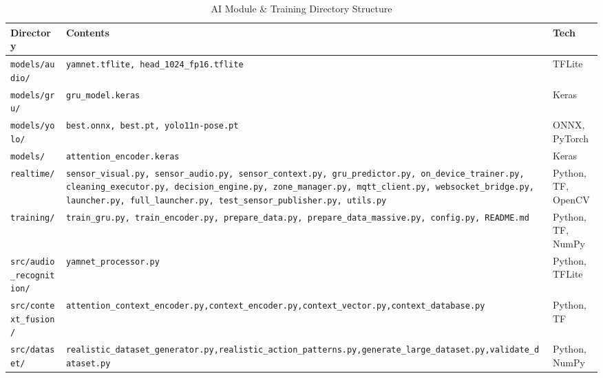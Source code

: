 \documentclass[conference]{IEEEtran}
\begin{document}
\begin{table}[H]
\caption{AI Module \& Training Directory Structure}
\def\arraystretch{1.2}
\footnotesize
\begin{tabular}{|>{\raggedright\arraybackslash}p{2.6cm}|>{\raggedright\arraybackslash}p{3.5cm}|p{1.4cm}|}
\hline
\textbf{Directory} & \textbf{Contents} & \textbf{Tech} \\
\hline
\texttt{models/audio/} & \texttt{yamnet.tflite, head\_1024\_fp16.tflite} & TFLite \\
\hline
\texttt{models/gru/} & \texttt{gru\_model.keras} & Keras \\
\hline
\texttt{models/yolo/} & \texttt{best.onnx, best.pt, yolo11n-pose.pt} & ONNX, PyTorch \\
\hline
\texttt{models/} & \texttt{attention\_encoder.keras} & Keras \\
\hline
\texttt{realtime/} & \texttt{sensor\_visual.py, sensor\_audio.py, sensor\_context.py, gru\_predictor.py, on\_device\_trainer.py, cleaning\_executor.py, decision\_engine.py, zone\_manager.py, mqtt\_client.py, websocket\_bridge.py, launcher.py, full\_launcher.py, test\_sensor\_publisher.py, utils.py} & Python, TF, OpenCV \\
\hline
\texttt{training/} & \texttt{train\_gru.py, train\_encoder.py, prepare\_data.py, prepare\_data\_massive.py, config.py, README.md} & Python, TF, NumPy \\
\hline
\texttt{src/}\newline\texttt{audio\_recognition/} & \texttt{yamnet\_processor.py} & Python, TFLite \\
\hline
\texttt{src/}\newline\texttt{context\_fusion/} & \texttt{attention\_context\_}\newline\texttt{encoder.py,}\newline\texttt{context\_encoder.py,}\newline\texttt{context\_vector.py,}\newline\texttt{context\_database.py} & Python, TF \\
\hline
\texttt{src/}\newline\texttt{dataset/} & \texttt{realistic\_dataset\_}\newline\texttt{generator.py,}\newline\texttt{realistic\_action\_}\newline\texttt{patterns.py,}\newline\texttt{generate\_large\_}\newline\texttt{dataset.py,}\newline\texttt{validate\_dataset.py} & Python, NumPy \\

\end{tabular}
\end{table}
\end{document}

